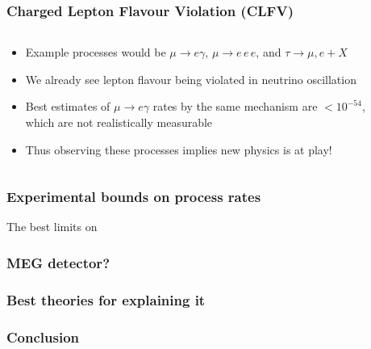\documentclass[11pt]{beamer}
\begin{document}
\begin{frame}
    \frametitle{Charged Lepton Flavour Violation (CLFV)}
    \begin{columns}[c]
        \begin{column}{0.6\textwidth}
            \begin{itemize}
                \item Example processes would be $\mu \rightarrow e\gamma$, $\mu\rightarrow e\,e\,e$, and $\tau \rightarrow \mu,e + X$
                \item We already see lepton flavour being violated in neutrino oscillation
                \item Best estimates of $\mu \rightarrow e\gamma$ rates by the same mechanism are $<10^{-54}$, which are not realistically measurable
                \item Thus observing these processes implies new physics is at play!
            \end{itemize}
        \end{column}

        \begin{column}{0.4\textwidth}
        \end{column}
    \end{columns}
\end{frame}

\begin{frame}
    \frametitle{Experimental bounds on process rates}
    The best limits on 

    

\end{frame}

\begin{frame}
    \frametitle{MEG detector?}

    

\end{frame}

\begin{frame}
    \frametitle{Best theories for explaining it}

    

\end{frame}

\begin{frame}
    \frametitle{Conclusion}

    

\end{frame}
\end{document}
